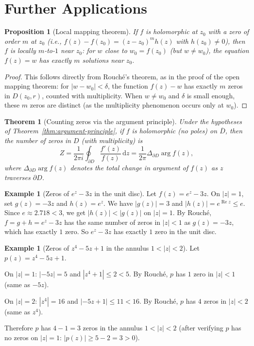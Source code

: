 \documentclass[12pt,a4paper,openany]{book}
\theoremstyle{definition}
\newtheorem{example}[definition]{Example}
\theoremstyle{plain}
\newtheorem{theorem}[definition]{Theorem}
\newtheorem{proposition}[definition]{Proposition}
\theoremstyle{remark}
\DeclareMathOperator{\re}{Re}
\newcommand{\dd}{\mathrm{d}}
\newcommand{\abs}[1]{\left|#1\right|}
\begin{document}
\section{Further Applications}\label{sec:further-apps-rouche}

\begin{proposition}[Local mapping theorem]\label{prop:local-mapping}
If $f$ is holomorphic at $z_0$ with a zero of order $m$ at $z_0$ (i.e.,
$f(z) - f(z_0) = (z-z_0)^m h(z)$ with $h(z_0) \neq 0$), then $f$ is
locally $m$-to-$1$ near $z_0$: for $w$ close to $w_0 = f(z_0)$ (but
$w \neq w_0$), the equation $f(z) = w$ has exactly $m$ solutions near $z_0$.
\end{proposition}

\begin{proof}
This follows directly from Rouch\'{e}'s theorem, as in the proof of the
open mapping theorem: for $\abs{w - w_0} < \delta$, the function
$f(z) - w$ has exactly $m$ zeros in $D(z_0,r)$, counted with multiplicity.
When $w \neq w_0$ and $\delta$ is small enough, these $m$ zeros are
distinct (as the multiplicity phenomenon occurs only at $w_0$).
\end{proof}

\begin{theorem}[Counting zeros via the argument principle]\label{thm:counting-formula}
Under the hypotheses of Theorem~\ref{thm:argument-principle}, if $f$
is holomorphic (no poles) on $\overline{D}$, then the number of
zeros in $D$ (with multiplicity) is
\[
  Z = \frac{1}{2\pi i}\oint_{\partial D} \frac{f'(z)}{f(z)}\,\dd z
  = \frac{1}{2\pi}\Delta_{\partial D}\arg f(z),
\]
where $\Delta_{\partial D}\arg f(z)$ denotes the total change in argument
of $f(z)$ as $z$ traverses $\partial D$.
\end{theorem}

\begin{example}[Zeros of $e^z - 3z$ in the unit disc]\label{ex:ez-3z}
Let $f(z) = e^z - 3z$. On $\abs{z} = 1$, set $g(z) = -3z$ and
$h(z) = e^z$. We have $\abs{g(z)} = 3$ and $\abs{h(z)} = e^{\re z} \leq e$.
Since $e \approx 2.718 < 3$, we get $\abs{h(z)} < \abs{g(z)}$ on $\abs{z}=1$.
By Rouch\'{e}, $f = g + h = e^z - 3z$ has the same number of zeros in
$\abs{z}<1$ as $g(z) = -3z$, which has exactly $1$ zero. So $e^z - 3z$
has exactly $1$ zero in the unit disc.
\end{example}

\begin{example}[Zeros of $z^4 - 5z + 1$ in the annulus $1 < \abs{z} < 2$]\label{ex:annulus-zeros}
Let $p(z) = z^4 - 5z + 1$.

On $\abs{z} = 1$: $\abs{-5z} = 5$ and $\abs{z^4 + 1} \leq 2 < 5$.
By Rouch\'{e}, $p$ has $1$ zero in $\abs{z} < 1$ (same as $-5z$).

On $\abs{z} = 2$: $\abs{z^4} = 16$ and $\abs{-5z+1} \leq 11 < 16$.
By Rouch\'{e}, $p$ has $4$ zeros in $\abs{z} < 2$ (same as $z^4$).

Therefore $p$ has $4 - 1 = 3$ zeros in the annulus $1 < \abs{z} < 2$
(after verifying $p$ has no zeros on $\abs{z}=1$: $\abs{p(z)} \geq 5-2=3>0$).
\end{example}
\end{document}
